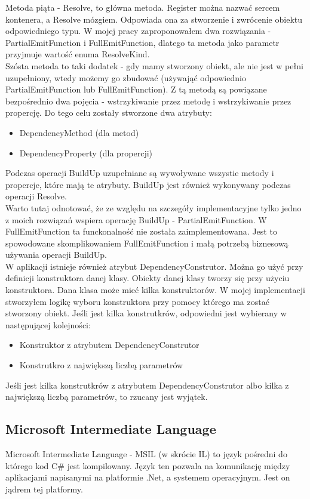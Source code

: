 \documentclass[12pt]{article}
\begin{document}
Metoda piąta - Resolve, to główna metoda. Register można nazwać sercem kontenera, a Resolve mózgiem. Odpowiada ona za stworzenie i zwrócenie obiektu odpowiedniego typu. W mojej pracy zaproponowałem dwa rozwiązania - PartialEmitFunction i FullEmitFunction, dlatego ta metoda jako parametr przyjmuje wartość enuma ResolveKind.\\
Szósta metoda to taki dodatek - gdy mamy stworzony obiekt, ale nie jest w pełni uzupełniony, wtedy możemy go zbudować (używająć odpowiednio PartialEmitFunction lub FullEmitFunction). Z tą metodą są powiązane bezpośrednio dwa pojęcia - wstrzykiwanie przez metodę i wstrzykiwanie przez propercję. Do tego celu zostały stworzone dwa atrybuty:
\begin{itemize}
	\item DependencyMethod (dla metod)
	\item DependencyProperty (dla propercji)
\end{itemize}
Podczas operacji BuildUp uzupełniane są wywoływane wszystie metody i propercje, które mają te atrybuty. BuildUp jest również wykonywany podczas operacji Resolve.\\
Warto tutaj odnotować, że ze względu na szczegóły implementacyjne tylko jedno z moich rozwiązań wspiera operację BuildUp - PartialEmitFunction. W FullEmitFunction ta funckonalność nie została zaimplementowana. Jest to spowodowane skomplikowaniem FullEmitFunction i małą potrzebą biznesową używania operacji BuildUp.\\

W aplikacji istnieje również atrybut DependencyConstrutor. Można go użyć przy definicji konstruktora danej klasy. Obiekty danej klasy tworzy się przy użyciu konstruktora. Dana klasa może mieć kilka konstruktorów. W mojej implementacji stworzyłem logikę wyboru konstruktora przy pomocy którego ma zostać stworzony obiekt. Jeśli jest kilka konstrutkrów, odpowiedni jest wybierany w następującej kolejności:
\begin{itemize}
	\item Konstruktor z atrybutem DependencyConstrutor
	\item Konstrutkro z największą liczbą parametrów
\end{itemize}
Jeśli jest kilka konstrutkrów z atrybutem DependencyConstrutor albo kilka z największą liczbą parametrów, to rzucany jest wyjątek.\\


\subsection{Microsoft Intermediate Language}
Microsoft Intermediate Language - MSIL (w skrócie IL) to język pośredni do którego kod C\# jest kompilowany. Język ten pozwala na komunikację między aplikacjami napisanymi na platformie .Net, a systemem operacyjnym. Jest on jądrem tej platformy.
\end{document}
